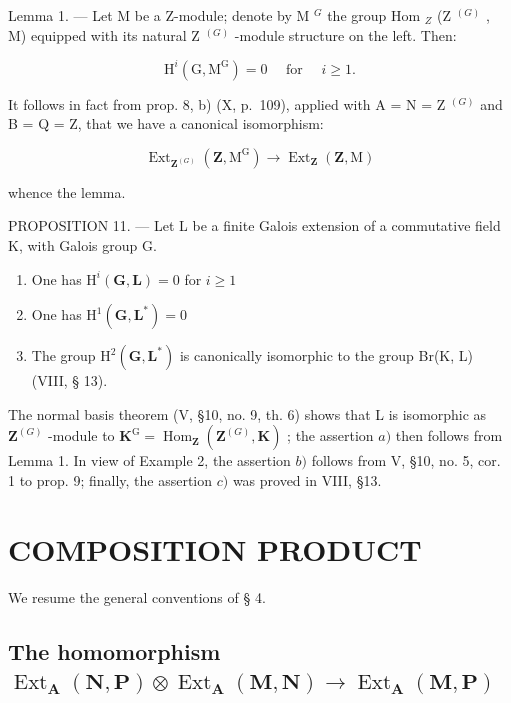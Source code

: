 Lemma 1. --- Let M be a Z-module; denote by M \(^{G}\) the group Hom \(_{Z}\) (Z \(^{(G)}\) , M) equipped with its natural Z \(^{(G)}\) -module structure on the left. Then:

\[
\mathrm{H} ^ {i} (\mathrm{G}, \mathrm{M} ^ {\mathrm{G}}) = 0 \quad \text { for } \quad i \geqslant 1.
\]

It follows in fact from prop. 8, b) (X, p.~109), applied with A = N = Z \(^{(G)}\) and B = Q = Z, that we have a canonical isomorphism:

\[
\operatorname{Ext} _ {\mathbf {Z} ^ {(G)}} \left(\mathbf {Z}, \mathrm{M} ^ {\mathrm{G}}\right)\rightarrow \operatorname{Ext} _ {\mathbf {Z}} (\mathbf {Z}, \mathrm{M})
\]

whence the lemma.

PROPOSITION 11. --- Let L be a finite Galois extension of a commutative field K, with Galois group G.

\begin{enumerate}
\def\labelenumi{\alph{enumi})}
\item
  One has \(\mathrm{H}^i (\mathbf{G},\mathbf{L}) = 0\) for \(i\geqslant 1\)
\item
  One has \(\mathrm{H}^1 (\mathbf{G},\mathbf{L}^*) = 0\)
\item
  The group \(\mathrm{H}^2 (\mathbf{G},\mathbf{L}^*)\) is canonically isomorphic to the group Br(K, L) (VIII, § 13).
\end{enumerate}

The normal basis theorem (V, §10, no. 9, th. 6) shows that L is isomorphic as \(\mathbf{Z}^{(G)}\) -module to \(\mathbf{K}^{\mathrm{G}} = \operatorname{Hom}_{\mathbf{Z}}(\mathbf{Z}^{(G)}, \mathbf{K})\) ; the assertion \(a)\) then follows from Lemma 1. In view of Example 2, the assertion \(b)\) follows from V, §10, no. 5, cor. 1 to prop. 9; finally, the assertion \(c)\) was proved in VIII, §13.

\section{COMPOSITION PRODUCT}

We resume the general conventions of § 4.

\subsection{\texorpdfstring{The homomorphism \(\operatorname{Ext}_{\mathbf{A}}(\mathbf{N}, \mathbf{P}) \otimes \operatorname{Ext}_{\mathbf{A}}(\mathbf{M}, \mathbf{N}) \to \operatorname{Ext}_{\mathbf{A}}(\mathbf{M}, \mathbf{P})\)}{The homomorphism \textbackslash operatorname\{Ext\}\_\{\textbackslash mathbf\{A\}\}(\textbackslash mathbf\{N\}, \textbackslash mathbf\{P\}) \textbackslash otimes \textbackslash operatorname\{Ext\}\_\{\textbackslash mathbf\{A\}\}(\textbackslash mathbf\{M\}, \textbackslash mathbf\{N\}) \textbackslash to \textbackslash operatorname\{Ext\}\_\{\textbackslash mathbf\{A\}\}(\textbackslash mathbf\{M\}, \textbackslash mathbf\{P\})}}

